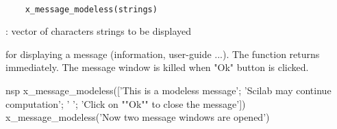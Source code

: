 
\begin{mandesc}
  \\ %
\end{mandesc}
\label{x-message-modeless}
\begin{calling_sequence}
  \begin{verbatim}
    x_message_modeless(strings)   
  \end{verbatim}
\end{calling_sequence}
\begin{parameters}
  \begin{varlist}
    : vector of characters strings to be displayed
  \end{varlist}
\end{parameters}
\begin{mandescription}
  for displaying a message (information, user-guide ...). The function
  returns immediately. The message window is killed when "Ok" button is
  clicked.
\end{mandescription}
\begin{examples}
\begin{mintednsp}{nsp}
x_message_modeless(['This is a modeless message';
                    'Scilab may continue computation';
                    ' ';
	            'Click on ""Ok"" to close the message'])
x_message_modeless('Now two message windows are opened')
\end{mintednsp}
\end{examples}
\begin{manseealso}
      
\end{manseealso}

